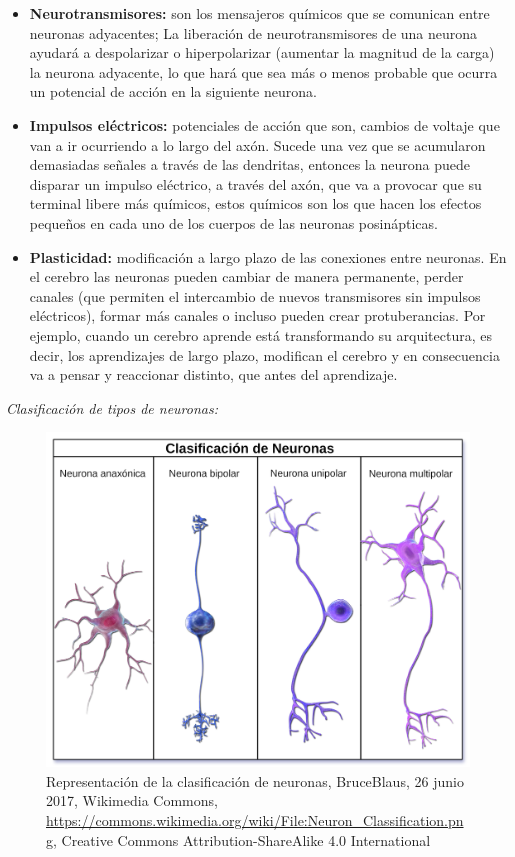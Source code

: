 \begin{itemize}
\item \textbf{Neurotransmisores:} son los mensajeros químicos que se comunican entre neuronas adyacentes; La liberación de neurotransmisores de una neurona ayudará a despolarizar o hiperpolarizar (aumentar la magnitud de la carga) la neurona adyacente, lo que hará que sea más o menos probable que ocurra un potencial de acción en la siguiente neurona.
 
\item \textbf{Impulsos eléctricos:} potenciales de acción que son, cambios de voltaje que van a ir ocurriendo a lo largo del axón. Sucede una vez que se acumularon demasiadas señales a través de las dendritas, entonces la neurona puede disparar un impulso eléctrico, a través del axón, que va a provocar que su terminal libere más químicos, estos químicos son los que hacen los efectos pequeños en cada uno de los cuerpos de las neuronas posinápticas.
 
\item \textbf{Plasticidad:} modificación a largo plazo de las conexiones entre neuronas. En el cerebro las neuronas pueden cambiar de manera permanente, perder canales (que permiten el intercambio de nuevos transmisores sin impulsos eléctricos), formar más canales o incluso pueden crear protuberancias. Por ejemplo, cuando un cerebro aprende está transformando su arquitectura, es decir, los aprendizajes de largo plazo, modifican el cerebro y en consecuencia va a pensar y reaccionar distinto, que antes del aprendizaje.
\end{itemize}

\emph{Clasificación de tipos de neuronas:}




\begin{figure}[h]
 \centering
 \includegraphics[scale=0.15]{../Figuras/tiposDeNeuronas.png}
 \caption{Representación de la clasificación de neuronas, BruceBlaus, 26 junio 2017, Wikimedia Commons, \url{https://commons.wikimedia.org/wiki/File:Neuron_Classification.png}, Creative Commons Attribution-ShareAlike 4.0 International}
 \label{fig:tiposNeuro}
\end{figure}




